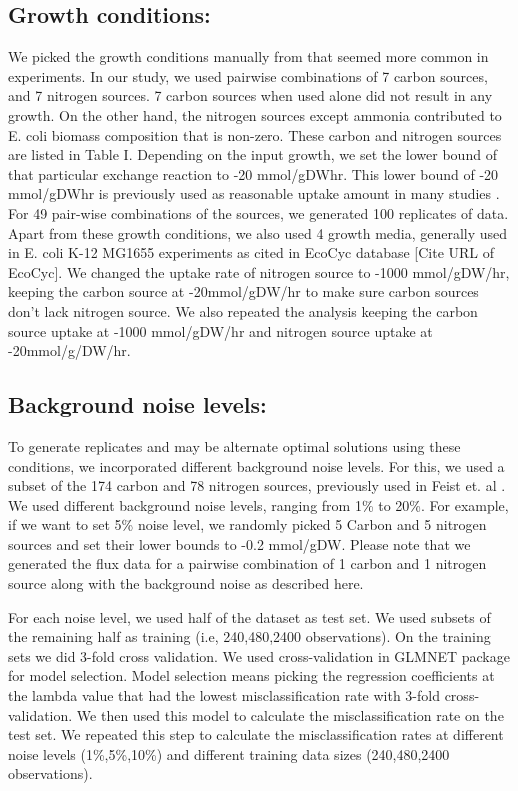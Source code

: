\documentclass[12pt]{article}
\begin{document}
\subsection*{Growth conditions:} 
We picked the growth conditions manually from \cite{Feistetal2007} that seemed more common in experiments. In our study, we used pairwise combinations of 7 carbon sources, and 7 nitrogen sources. 7 carbon sources when used alone did not result in any growth. On the other hand, the nitrogen sources except ammonia contributed to E. coli biomass composition that is non-zero. These carbon and nitrogen sources are listed in Table I. Depending on the input growth, we set the lower bound of that particular exchange reaction to -20 mmol/gDWhr. This lower bound of -20 mmol/gDWhr is previously used as reasonable uptake amount in many studies \cite{Feistetal2007}. For 49 pair-wise combinations of the sources, we generated 100 replicates of data. Apart from these growth conditions, we also used 4 growth media, generally used in E. coli K-12 MG1655 experiments as cited in EcoCyc database [Cite URL of EcoCyc].
\bigskip
\noindent
We changed the uptake rate of nitrogen source to -1000 mmol/gDW/hr, keeping the carbon source at -20mmol/gDW/hr to make sure carbon sources don't lack nitrogen source. We also repeated the analysis keeping the carbon source uptake at -1000 mmol/gDW/hr and nitrogen source uptake at -20mmol/g/DW/hr. 


\subsection*{Background noise levels:} 
To generate replicates and may be alternate optimal solutions using these conditions, we incorporated different background noise levels. For this, we used a subset of the 174 carbon and 78 nitrogen sources, previously used in Feist et. al \cite{Feistetal2007}.  We used different background noise levels, ranging from 1\% to 20\%. For example, if we want to set 5\% noise level, we randomly picked 5 Carbon and 5 nitrogen sources and set their lower bounds to -0.2 mmol/gDW. Please note that we generated the flux data for a pairwise combination of 1 carbon and 1 nitrogen source along with the background noise as described here. 

\bigskip
\noindent
For each noise level, we used half of the dataset as test set. We used subsets of the remaining half as training (i.e, 240,480,2400 observations). On the training sets we did 3-fold cross validation. We used cross-validation in GLMNET package for model selection. Model selection means picking the regression coefficients at the lambda value that had the lowest misclassification rate with 3-fold cross-validation. We then used this model to calculate the misclassification rate on the test set. We repeated this step to calculate the misclassification rates at different noise levels (1\%,5\%,10\%) and different training data sizes (240,480,2400 observations).
\end{document}
